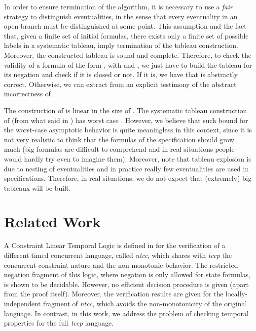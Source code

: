 \documentclass[american]{new_tlp}
\newcommand*{\ntcc}{\textit{ntcc}}
\newcommand*{\tccp}{\textit{tccp}}
\begin{document}
In order to ensure termination of the algorithm, it is necessary to use a
\emph{fair} strategy to distinguish eventualities, in the sense that every
eventuality in an open branch must be distinguished at some point.  This
assumption and the fact that, given a finite set of initial formulas, there
exists only a finite set of possible labels in a systematic tableau, imply
termination of the tableau construction.  Moreover, the constructed tableau
is sound and complete.  Therefore, to check the validity of a formula of
the form , with  and , we just have to build the tableau for its
negation  and check if it is closed or
not.  If it is, we have that  is abstractly correct.  Otherwise, we can
extract from  an explicit testimony
 of the abstract incorrectness of .

The construction of  is linear in the
size of .  The systematic tableau construction of
 (from what said in \cite{GaintzarainHLNO09})
has worst case .  However, we
believe that such bound for the worst-case asymptotic behavior is quite
meaningless in this context, since it is not very realistic to think that
the formulas of the specification should grow much (big formulas are
difficult to comprehend and in real situations people would hardly try even
to imagine them).  Moreover, note that tableau explosion is due to nesting
of eventualities and in practice really few eventualities are used in
specifications.  Therefore, in real situations, we do not expect that
(extremely) big tableaux will be built.


\section{Related Work}



A Constraint Linear Temporal Logic is defined in \cite{Valencia05} for the
verification of a different timed concurrent language, called \ntcc{},
which shares with \tccp{} the concurrent constraint nature and the
non-monotonic behavior.  The restricted negation fragment of this logic,
where negation is only allowed for state formulas, is shown to be
decidable.  However, no efficient decision procedure is given (apart from
the proof itself).  Moreover, the verification results are given for the
locally-independent fragment of \ntcc{}, which avoids the non-monotonicity
of the original language.  In contrast, in this work, we address the
problem of checking temporal properties for the full \tccp{} language.
\end{document}

